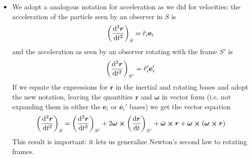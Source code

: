 \documentclass[11pt, a4paper]{article}
\newcommand{\e}{\mathbf{e}} %
\newcommand{\bdot}[1]{\dot{\bm{#1}}} %
\newcommand{\bddot}[1]{\ddot{\bm{#1}}} %
\begin{document}
\begin{itemize}
	\item We adopt a analogous notation for acceleration as we did for velocities: the acceleration of the particle seen by an observer in $ S $ is
	\begin{equation*}
		\left(\dv[2]{\bm{r}}{t}\right)_{S} = \ddot{r}_{i}\e_{i}
	\end{equation*}
	and the acceleration as seen by an observer rotating with the frame $ S' $ is
	\begin{equation*}
		\left(\dv[2]{\bm{r}}{t}\right)_{S'} = \ddot{r}_{i}'\e_{i}'
	\end{equation*}
	If we equate the expressions for $ \bddot{r} $ in the inertial and rotating bases and adopt the new notation, leaving the quantities $ \bm{r} $ and $ \bm{\omega} $ in vector form (i.e. not expanding them in either the $ \e_{i} $ or $ \e_{i}' $ bases) we get the vector equation
	\begin{equation*}
		\left(\dv[2]{\bm{r}}{t}\right)_{S} = \left(\dv[2]{\bm{r}}{t}\right)_{S'} + 2 \bm{\omega} \cross  \left(\dv{\bm{r}}{t}\right)_{S'} + \bdot{\omega} \cross \bm{r} + \bm{\omega} \cross (\bm{\omega} \cross \bm{r})
	\end{equation*}
	This result is important: it lets us generalize Newton's second law to rotating frames.
\end{itemize}
\end{document}
